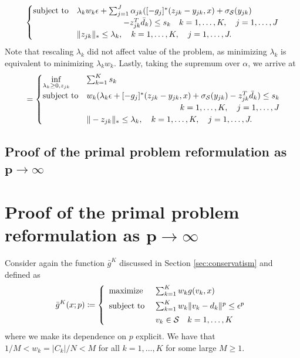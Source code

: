 \documentclass[12pt]{article}
\theoremstyle{thmstyleone}%
\theoremstyle{thmstyletwo}%
\theoremstyle{thmstylethree}%
\begin{document}
\begin{appendices}
{\begin{equation*}
\begin{aligned}
\begin{cases}
	\mbox{subject to} &  \lambda_k w_k\epsilon + \sum_{j=1}^J \alpha_{jk} ([-g_j]^*(z_{jk} - y_{jk},x) + \sigma_{\mathcal{S}}(y_{jk}) \\
	&\hspace{2cm} - z_{jk}^T\bar{d}_k) \le s_k \quad k = 1,\dots,K, \quad j = 1,\dots,J\\
	& \|z_{jk}\|_*\leq \lambda_k,\quad k = 1,\dots,K, \quad j = 1,\dots,J.
\end{cases}\\
\end{aligned}
\end{equation*}
Note that rescaling $\lambda_k$ did not affect value of the problem, as minimizing $\lambda_k$ is equivalent to minimizing $\lambda_k w_k$.
Lastly, taking the supremum over $\alpha$, we arrive at
\begin{equation*}
	\begin{aligned}
	&= \begin{cases}
		\underset{\lambda_k \geq 0, z_{jk}}{\inf} &  \sum_{k=1} ^K s_k \\
		\mbox{subject to} & w_k(\lambda_k\epsilon + [-g_j]^*(z_{jk} - y_{jk},x) + \sigma_{\supp}(y_{jk})  - z_{jk}^T\bar{d}_k) \le s_k\\
		&\hfill  \quad k = 1,\dots,K, \quad j = 1,\dots,J\\
		& \|-z_{jk}\|_*\leq \lambda_k,\quad k = 1,\dots,K, \quad j = 1,\dots,J.
	\end{cases}\\
	\end{aligned}
	\end{equation*}
}



\ifpreprint
\subsection{Proof of the primal problem reformulation as $\mathbf{p \rightarrow \infty}$}
\else
\section{Proof of the primal problem reformulation as $\mathbf{p \rightarrow \infty}$}
\fi
\label{app:primal_limit}


Consider again the function $\bar g^K$ discussed in Section \ref{sec:conservatism} and defined as
\[
\bar g^K(x; p)
\defn
\left\{
\begin{array}{l@{~~~~}l}
	\mbox{maximize} & \sum_{k=1}^K w_k g(v_k, x) \\[0.5em]
     \mbox{subject to} & \sum_{k=1}^K w_k \norm{v_k-d_k}^p\leq \epsilon^p\\[0.5em]
          & v_k\in \supp \quad k = 1,\dots,K
\end{array}
\right.
\]
where we make its dependence on $p$ explicit.
We have that $1/M<w_k=|C_k|/N<M$ for all $k= 1,\dots, K$ for some large $M\geq 1$.


\end{appendices}
\end{document}
